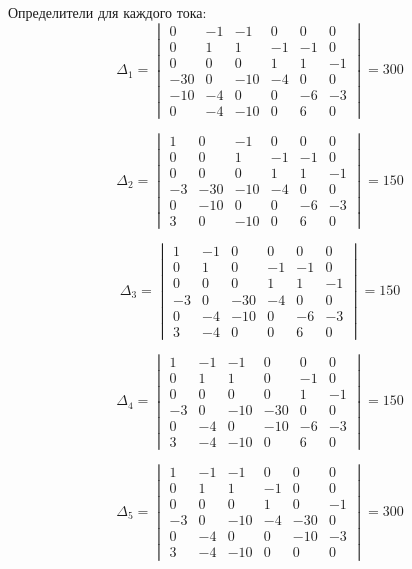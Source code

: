 Определители для каждого тока:
$$\Delta_1 = \begin{vmatrix}
0 & -1 & -1 & 0 & 0 & 0 \\
0 & 1 & 1 & -1 & -1 & 0 \\
0 & 0 & 0 & 1 & 1 & -1 \\
-30 & 0 & -10 & -4 & 0 & 0 \\
-10 & -4 & 0 & 0 & -6 & -3 \\
0 & -4 & -10 & 0 & 6 & 0
\end{vmatrix} = 300$$

$$\Delta_2 = \begin{vmatrix}
1 & 0 & -1 & 0 & 0 & 0 \\
0 & 0 & 1 & -1 & -1 & 0 \\
0 & 0 & 0 & 1 & 1 & -1 \\
-3 & -30 & -10 & -4 & 0 & 0 \\
0 & -10 & 0 & 0 & -6 & -3 \\
3 & 0 & -10 & 0 & 6 & 0
\end{vmatrix} = 150$$

$$\Delta_3 = \begin{vmatrix}
1 & -1 & 0 & 0 & 0 & 0 \\
0 & 1 & 0 & -1 & -1 & 0 \\
0 & 0 & 0 & 1 & 1 & -1 \\
-3 & 0 & -30 & -4 & 0 & 0 \\
0 & -4 & -10 & 0 & -6 & -3 \\
3 & -4 & 0 & 0 & 6 & 0
\end{vmatrix} = 150$$

$$\Delta_4 = \begin{vmatrix}
1 & -1 & -1 & 0 & 0 & 0 \\
0 & 1 & 1 & 0 & -1 & 0 \\
0 & 0 & 0 & 0 & 1 & -1 \\
-3 & 0 & -10 & -30 & 0 & 0 \\
0 & -4 & 0 & -10 & -6 & -3 \\
3 & -4 & -10 & 0 & 6 & 0
\end{vmatrix} = 150$$

$$\Delta_5 = \begin{vmatrix}
1 & -1 & -1 & 0 & 0 & 0 \\
0 & 1 & 1 & -1 & 0 & 0 \\
0 & 0 & 0 & 1 & 0 & -1 \\
-3 & 0 & -10 & -4 & -30 & 0 \\
0 & -4 & 0 & 0 & -10 & -3 \\
3 & -4 & -10 & 0 & 0 & 0
\end{vmatrix} = 300$$

